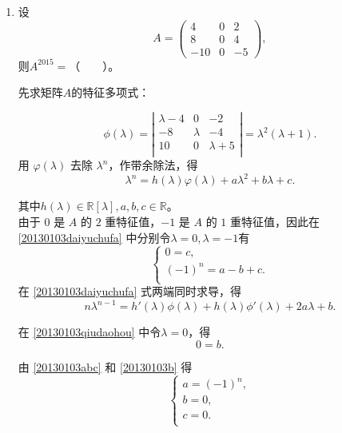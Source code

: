 \begin{enumerate}[1~]
\begin{enumerate}[1.~]
\item
设 
$$
A = \left( \begin{matrix}{ 4 } & { 0 } & { 2 } \\ { 8 } & { 0 } & { 4 } \\ { - 10 } & { 0 } & { - 5 } \end{matrix} \right),
$$
则$A^{2015}=$（\ \ \ \ ）。

\begin{solution}
先求矩阵$A$的特征多项式：

$$
\phi(\lambda) = \left| \begin{matrix}
	\lambda -4&		0&		-2\\
	-8&		\lambda&		-4\\
	10&		0&		\lambda+5\\
\end{matrix} \right| = \lambda^2 (\lambda+1).
$$
用 $\varphi(\lambda) $ 去除 $\lambda^n$，作带余除法，得\begin{equation}\label{20130103daiyuchufa}
\lambda^n = h(\lambda) \varphi(\lambda) +a \lambda^2+b \lambda +c .\end{equation}

其中$h(\lambda) \in \mathbb{R}[\lambda],a, b, c \in \mathbb{R}$。\\
由于 $0$ 是 $A$ 的 $2$ 重特征值，$-1$ 是 $A$ 的 $1$ 重特征值，因此在  \eqref{20130103daiyuchufa} 中分别令$\lambda = 0, \lambda = -1$有 \begin{equation}\label{20130103abc}
\left\{ \begin{array}{l}
0 = c,\\
(-1)^n = a-b+c.\\
\end{array} \right.\end{equation}
在  \eqref{20130103daiyuchufa} 式两端同时求导，得
\begin{equation} \label{20130103qiudaohou}
n \lambda^{n-1} = h'(\lambda) \phi(\lambda) +h(\lambda) \phi'(\lambda) + 2a\lambda + b.
\end{equation}

在 \eqref{20130103qiudaohou} 中令$\lambda = 0$，得
\begin{equation} \label{20130103b}
0 = b.
\end{equation}

由 \eqref{20130103abc} 和  \eqref{20130103b} 得
$$
\left\{ \begin{array}{l}
a = (-1)^n,\\
b = 0,\\
c = 0.\\
\end{array}\right.
$$


\end{solution}
\end{enumerate}
\end{enumerate}

